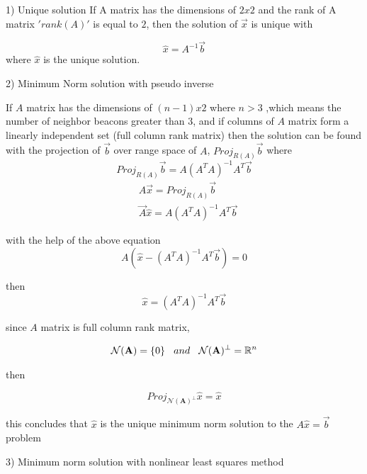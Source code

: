 \documentclass[twoside]{article}
\begin{document}
\begin{multicols}{2}
1) Unique solution
If A matrix has the dimensions of $2x2$ and the rank of A matrix $'rank(A)'$ is equal to $2$, then the solution of $\vec{x}$ is unique with

\begin{equation}
  \hat{x} = A^{-1}\vec{b}
\end{equation}
  where $\hat{x}$ is the unique solution. 
  
  
  2) Minimum Norm solution with pseudo inverse
  
  If $A$ matrix has the dimensions of $(n-1)x2$ where $n>3$ ,which means the number of neighbor beacons greater than $3$, and if columns of $A$ matrix form a linearly independent set (full column rank matrix) then the solution can be found with the projection of $\vec{b}$ over range space of $A$, $Proj_{R(A)}\vec{b}$ where
  \begin{equation}
  Proj_{R(A)}\vec{b} = A (A^TA)^{-1}A^T\vec{b}
  \end{equation}
  \begin{align*}
  & A\vec{x} = Proj_{R(A)}\vec{b}\\
  & \vec{A}\hat{x} = A(A^TA)^{-1}A^T\vec{b}
  \end{align*}
 
with the help of the above equation
\begin{equation}
  A(\hat{x} - (A^TA)^{-1}A^T\vec{b}) = 0
\end{equation}

then 
\begin{equation}
 \hat{x} = (A^TA)^{-1}A^T\vec{b}
\end{equation}
  
  since $A$ matrix is full column rank matrix,
  
  \begin{align*}
\mathcal{N}(\mathbf{A}) = \{0\} \hspace{0.3cm}  and  \hspace{0.3cm}  \mathcal{N}(\mathbf{A})^\perp =\mathbb{R} ^n 
  \end{align*}
  
  then 
  
  \begin{equation}
Proj_{ \mathcal{N}(\mathbf{A})^\perp}\hat{x} = \hat{x}
  \end{equation}
  
  this concludes that $\hat{x}$ is the unique minimum norm solution to the $A\hat{x} = \vec{b}$ problem
	
	
	3) Minimum norm solution with nonlinear least squares method
	

\end{multicols}
\end{document}
